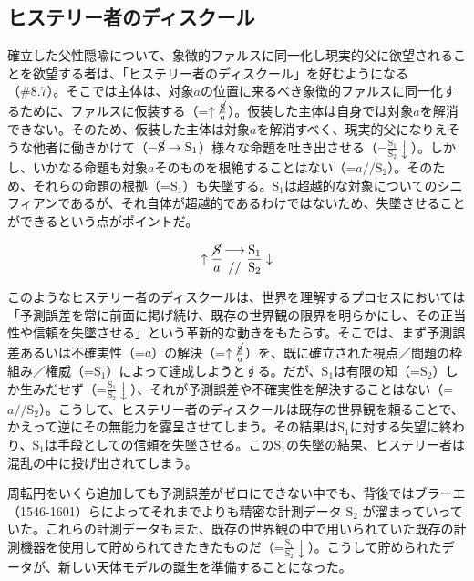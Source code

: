 \subsection{ヒステリー者のディスクール}\label{ux30d2ux30b9ux30c6ux30eaux30fcux8005ux306eux30c7ux30a3ux30b9ux30afux30fcux30eb}

確立した父性隠喩について、象徴的ファルスに同一化し現実的父に欲望されることを欲望する者は、「ヒステリー者のディスクール」を好むようになる（\#8.7）。そこでは主体は、対象\(a\)の位置に来るべき象徴的ファルスに同一化するために、ファルスに仮装する（=\(\uparrow\frac{\cancel{\textrm{S}}}{a}\)）。仮装した主体は自身では対象\(a\)を解消できない。そのため、仮装した主体は対象\(a\)を解消すべく、現実的父になりえそうな他者に働きかけて（=\(\cancel{\textrm{S}}\rightarrow\textrm{S}_1\)）様々な命題を吐き出させる（=\(\frac{\textrm{S}_1}{\textrm{S}_2}\downarrow\)）。しかし、いかなる命題も対象\(a\)そのものを根絶することはない（=\(a//\textrm{S}_2\)）。そのため、それらの命題の根拠（=\(\textrm{S}_1\)）も失墜する。\(\textrm{S}_1\)は超越的な対象についてのシニフィアンであるが、それ自体が超越的であるわけではないため、失墜させることができるという点がポイントだ。

\[
\uparrow\frac{\mathrm{\cancel{S}}}{a}\genfrac{}{}{0pt}{}{\longrightarrow}{//}\frac{\mathrm{S_1}}{\mathrm{S_2}}\downarrow
\]

このようなヒステリー者のディスクールは、世界を理解するプロセスにおいては「予測誤差を常に前面に掲げ続け、既存の世界観の限界を明らかにし、その正当性や信頼を失墜させる」という革新的な動きをもたらす。そこでは、まず予測誤差あるいは不確実性（=\(a\)）の解決（=\(\uparrow\frac{\cancel{\textrm{S}}}{a}\)）を、既に確立された視点／問題の枠組み／権威（=\(\textrm{S}_1\)）によって達成しようとする。だが、\(\textrm{S}_1\)は有限の知（=\(\textrm{S}_2\)）しか生みだせず（=\(\frac{\textrm{S}_1}{\textrm{S}_2}\downarrow\)）、それが予測誤差や不確実性を解決することはない（=\(a//\textrm{S}_2\)）。こうして、ヒステリー者のディスクールは既存の世界観を頼ることで、かえって逆にその無能力を露呈させてしまう。その結果は\(\textrm{S}_1\)に対する失望に終わり、\(\textrm{S}_1\)は手段としての信頼を失墜させる。この\(\textrm{S}_1\)の失墜の結果、ヒステリー者は混乱の中に投げ出されてしまう。

周転円をいくら追加しても予測誤差がゼロにできない中でも、背後ではブラーエ（1546-1601）らによってそれまでよりも精密な計測データ
\(\textrm{S}_2\)
が溜まっていっていた。これらの計測データもまた、既存の世界観の中で用いられていた既存の計測機器を使用して貯められてきたきたものだ（=\(\frac{\textrm{S}_1}{\textrm{S}_2}\downarrow\)）。こうして貯められたデータが、新しい天体モデルの誕生を準備することになった。

